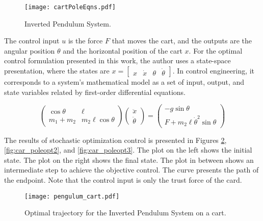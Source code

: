 \documentclass[]{hdsr}
\begin{document}
\begin{figure}[H]
    \centering
    \texttt{[image: cartPoleEqns.pdf]} \\
    \caption{Inverted Pendulum System.}
    \label{fig:car_pole}
\end{figure}

The control input $u$ is the force $F$ that moves the cart, and the outputs are the angular position $\theta$ and the horizontal position of the cart $x$. For the optimal control formulation presented in this work, the author uses a state-space presentation, where the states are  $x=\begin{bmatrix} x & \dot{x} & \theta & \dot{\theta} \end{bmatrix} $. In control engineering, it corresponds to a system's mathematical model as a set of input, output, and state variables related by first-order differential equations.

\begin{equation}
\left(\begin{array}{cc}
\cos \theta & \ell \\
m_{1}+m_{2} & m_{2} \ell \cos \theta
\end{array}\right)\left(\begin{array}{l}
\ddot{x} \\
\ddot{\theta}
\end{array}\right)=\left(\begin{array}{c}
-g \sin \theta \\
F+m_{2} \ell \dot{\theta}^{2} \sin \theta
\end{array}\right) 
\label{eq:car_pole}
\end{equation}

The results of stochastic optimization control is presented in Figures \ref{fig:car_poleopt}, \ref{fig:car_poleopt2}, and \ref{fig:car_poleopt3}. The plot on the left shows the initial state. The plot on the right shows the final state. The plot in between shows an intermediate step to achieve the objective control. The curve presents the path of the endpoint. Note that the control input is only the trust force of the card. 

\begin{figure}[H]
    \centering
    \texttt{[image: pengulum\_cart.pdf]} \\
    \caption{Optimal trajectory for the Inverted Pendulum System on a cart.}
    \label{fig:car_poleopt}
\end{figure}
\end{document}

